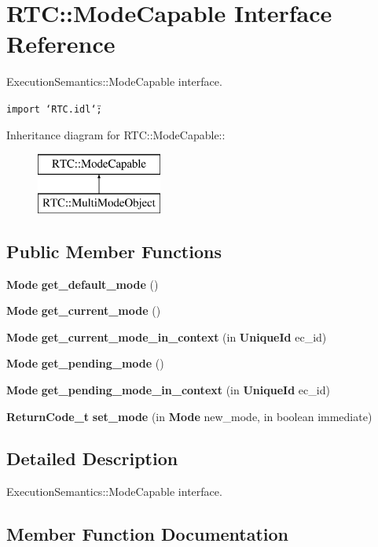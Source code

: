 \section{RTC::Mode\-Capable Interface Reference}
\label{interfaceRTC_1_1ModeCapable}
Execution\-Semantics::Mode\-Capable interface.  


{\tt import \char`\"{}RTC.idl\char`\"{};}

Inheritance diagram for RTC::Mode\-Capable::\begin{figure}[H]
\begin{center}
\leavevmode
\includegraphics[height=2cm]{interfaceRTC_1_1ModeCapable}
\end{center}
\end{figure}
\subsection*{Public Member Functions}
\begin{CompactItemize}
\item 
{\bf Mode} {\bf get\_\-default\_\-mode} ()
\item 
{\bf Mode} {\bf get\_\-current\_\-mode} ()
\item 
{\bf Mode} {\bf get\_\-current\_\-mode\_\-in\_\-context} (in {\bf Unique\-Id} ec\_\-id)
\item 
{\bf Mode} {\bf get\_\-pending\_\-mode} ()
\item 
{\bf Mode} {\bf get\_\-pending\_\-mode\_\-in\_\-context} (in {\bf Unique\-Id} ec\_\-id)
\item 
{\bf Return\-Code\_\-t} {\bf set\_\-mode} (in {\bf Mode} new\_\-mode, in boolean immediate)
\end{CompactItemize}


\subsection{Detailed Description}
Execution\-Semantics::Mode\-Capable interface. 



\subsection{Member Function Documentation}
